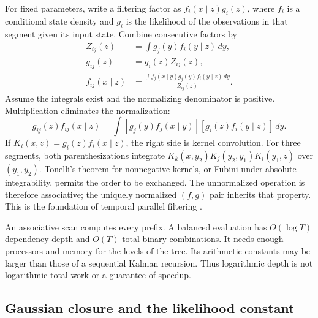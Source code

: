 For fixed parameters, write a filtering factor as
$f_i(x\mid z)g_i(z)$, where $f_i$ is a conditional state density and $g_i$
is the likelihood of the observations in that segment given its input state.
Combine consecutive factors by
\begin{align}
 Z_{ij}(z)&=\int g_j(y)f_i(y\mid z)\,dy,\\
 g_{ij}(z)&=g_i(z)Z_{ij}(z),\\
 f_{ij}(x\mid z)&=
  \frac{\int f_j(x\mid y)g_j(y)f_i(y\mid z)\,dy}{Z_{ij}(z)}.
 \label{eq:bf-modern-parallel-composition}
\end{align}
Assume the integrals exist and the normalizing denominator is positive.
Multiplication eliminates the normalization:
\begin{equation}
 g_{ij}(z)f_{ij}(x\mid z)
   =\int[g_j(y)f_j(x\mid y)][g_i(z)f_i(y\mid z)]\,dy.
 \label{eq:bf-modern-parallel-kernel}
\end{equation}
If $K_i(x,z)=g_i(z)f_i(x\mid z)$, the right side is kernel convolution.
For three segments, both parenthesizations integrate
$K_k(x,y_2)K_j(y_2,y_1)K_i(y_1,z)$ over $(y_1,y_2)$. Tonelli's theorem for
nonnegative kernels, or Fubini under absolute integrability, permits the
order to be exchanged. The unnormalized operation is therefore associative;
the uniquely normalized $(f,g)$ pair inherits that property. This is the
foundation of temporal parallel filtering
\citep[Definition 2 and Theorem 3]{sarkka2020parallel}.

An associative scan computes every prefix. A balanced evaluation has
$O(\log T)$ dependency depth and $O(T)$ total binary combinations. It needs
enough processors and memory for the levels of the tree. Its arithmetic
constants may be larger than those of a sequential Kalman recursion. Thus
logarithmic depth is not logarithmic total work or a guarantee of speedup.

\subsection{Gaussian closure and the likelihood constant}


